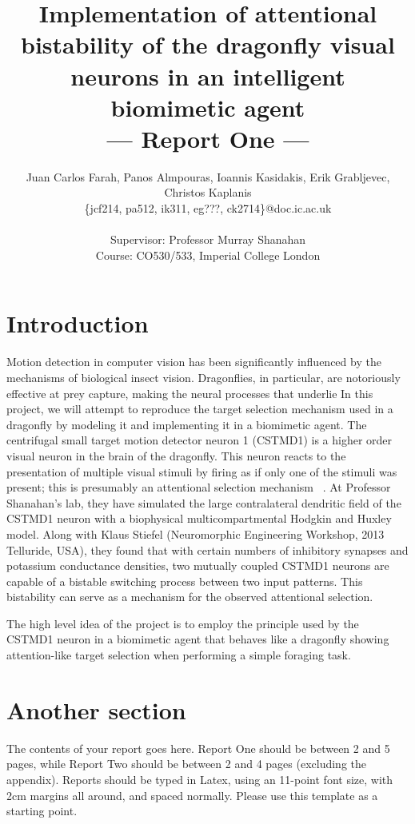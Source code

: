 \documentclass[a4paper,11pt]{article}
\title{Implementation of attentional bistability of the dragonfly visual neurons in an intelligent biomimetic agent\\\Large{--- Report One ---}}
\author{Juan Carlos Farah, Panos Almpouras, Ioannis Kasidakis, Erik Grabljevec, Christos Kaplanis\\
       \{jcf214, pa512, ik311, eg???, ck2714\}@doc.ic.ac.uk\\ \\
       \small{Supervisor: Professor Murray Shanahan}\\
       \small{Course: CO530/533, Imperial College London}
}
\begin{document}
\maketitle

\section{Introduction}

Motion detection in computer vision has been significantly influenced by the mechanisms of biological insect vision. Dragonflies, in particular, are notoriously effective at prey capture, making the neural processes that underlie In this project, we will attempt to reproduce the target selection mechanism used in a dragonfly by modeling it and implementing it in a biomimetic agent. 
The centrifugal small ­target motion detector neuron 1 (CSTMD1) is a higher ­order visual neuron in the brain of the dragonfly. This neuron reacts to the presentation of multiple visual stimuli by firing as if only one of the stimuli was present; this is presumably an attentional selection mechanism ~\cite{w13}. At Professor Shanahan’s lab, they have simulated the large contralateral dendritic field of the CSTMD1 neuron with a biophysical multi­compartmental Hodgkin and Huxley model. Along with Klaus Stiefel (Neuromorphic Engineering Workshop, 2013 Telluride, USA), they found that with certain numbers of inhibitory synapses and potassium conductance densities, two mutually coupled CSTMD1 neurons are capable of a bistable switching process between two input patterns. This bistability can serve as a mechanism for the observed attentional selection.

The high­ level idea of the project is to employ the principle used by the CSTMD1 neuron in a biomimetic agent that behaves like a dragonfly showing attention-­like target selection when performing a simple foraging task.



\section{Another section}

The contents of your report goes here.  Report One should be between 2
and 5 pages, while Report Two should be between 2 and 4 pages
(excluding the appendix).  Reports should be typed in Latex, using an
11-point font size, with 2cm margins all around, and spaced normally.
Please use this template as a starting point.
\end{document}
